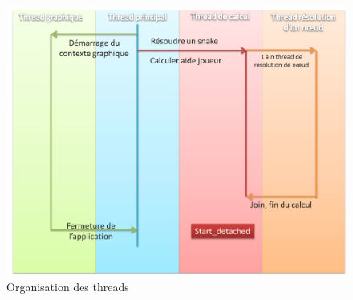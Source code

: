 \begin{figure}[h]
 \centering
 \includegraphics[scale=0.4,keepaspectratio=true]{img/threads.png}
 \caption{Organisation des threads}
 \label{threads}
\end{figure}